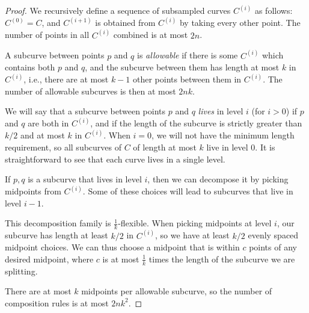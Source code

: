 \documentclass{article}
\begin{document}
\begin{proof}
  We recursively define a sequence of subsampled curves $C^{(i)}$ as
  follows: $C^{(0)} = C$, and $C^{(i+1)}$ is obtained from $C^{(i)}$
  by taking every other point. The number of points in all $C^{(i)}$
  combined is at most $2n$.

  A subcurve between points $p$ and $q$ is \emph{allowable} if there
  is some $C^{(i)}$ which contains both $p$ and $q$, and the subcurve
  between them has length at most $k$ in $C^{(i)}$, i.e., there are at
  most $k-1$ other points between them in $C^{(i)}$. The number of
  allowable subcurves is then at most $2nk$.

  We will say that a subcurve between points $p$ and $q$ \emph{lives}
  in level $i$ (for $i>0$) if $p$ and $q$ are both in $C^{(i)}$, and
  if the length of the subcurve is strictly greater than $k/2$ and at
  most $k$ in $C^{(i)}$. When $i=0$, we will not have the minimum
  length requirement, so all subcurves of $C$ of length at most $k$
  live in level $0$. It is straightforward to see that each curve
  lives in a single level.

  If $p,q$ is a subcurve that lives in level $i$, then we can
  decompose it by picking midpoints from $C^{(i)}$. Some of these
  choices will lead to subcurves that live in level $i-1$.

  This decomposition family is $\frac{1}{k}$-flexible. When picking
  midpoints at level $i$, our subcurve has length at least $k/2$ in
  $C^{(i)}$, so we have at least $k/2$ evenly spaced midpoint
  choices. We can thus choose a midpoint that is within $c$ points of
  any desired midpoint, where $c$ is at most $\frac{1}{k}$ times the
  length of the subcurve we are splitting.
  
  There are at most $k$ midpoints per allowable subcurve, so the number
  of composition rules is at most $2nk^2$.
\end{proof}



\end{document}
